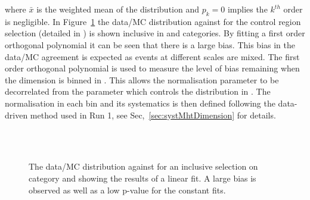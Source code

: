 where $\bar{x}$ is the weighted mean of the distribution and $p_k = 0$ 
implies the $k^{th}$ order is negligible.
In Figure~\ref{fig:linearMotiv} the data/MC 
distribution against \mht for the control region selection 
(detailed in \cite{Khachatryan:2016pxa}) is shown inclusive 
in \scalht and categories. By fitting a first order
orthogonal polynomial it can be seen that there is a large bias. 
This bias in the data/MC agreement is expected as events 
at different scales are mixed.
The first order orthogonal polynomial
is used to measure the level of bias remaining 
when the \mht dimension is binned in \scalht.
This allows the normalisation parameter to be
decorrelated from the parameter which controls
the distribution in \mht.
The normalisation in each \scalht bin and its systematics 
is then defined following the data-driven method used in Run 1, see Sec,~\ref{sec:systMhtDimension} for details.
\begin{figure}[h!]
  \centering
  ~~
  \\
  \\
  \caption{\label{fig:linearMotiv} 
  The data/MC distribution against \mht for an inclusive selection on category and \scalht
  showing the results of a linear fit. A large bias is observed as well as a low p-value for the constant fits. 
 }
\end{figure}


